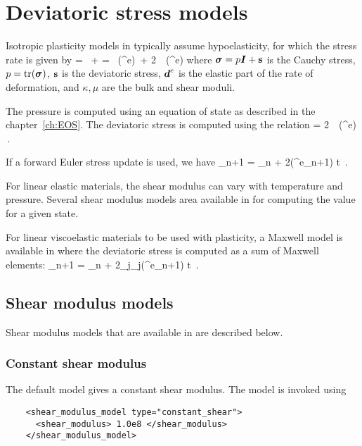 \chapter{Deviatoric stress models} \label{ch:DevStress}

Isotropic plasticity models in \Vaango typically assume hypoelasticity,
for which the stress rate is given by
\Beq
  \dot{\Bsig} = ~\BI + \dot{\Bs}
              = \kappa~\Tr(\BdT^e)~\BI + 2~\mu~\Dev(\BdT^e) 
\Eeq
where $\boldsymbol{\sigma} = p\boldsymbol{I} + \mathbf{s}$ is the Cauchy stress, $p = \text{tr}(\boldsymbol{\sigma})$, 
$\mathbf{s}$ is the deviatoric stress, $\boldsymbol{d}^e$ is the elastic part of
the rate of deformation, and $\kappa, \mu$ are the bulk and shear
moduli.  

The pressure is computed using an equation of state as
described in the chapter~\ref{ch:EOS}.  The deviatoric stress
is computed using the relation
\Beq
  \dot{\Bs} = 2~\mu~\Dev(\BdT^e) \,.
\Eeq

If a forward Euler stress update is used, we have
\Beq
  \Bs_{n+1} = \Bs_{n} + 2\mu\Dev(\BdT^e_{n+1}) \Delta t \,.
\Eeq

For linear elastic materials, the shear modulus can vary with temperature
and pressure.  Several shear modulus models area available in \Vaango
for computing the value for a given state.  

For linear viscoelastic materials to be used with plasticity, a Maxwell 
model is available in \Vaango where the deviatoric stress is computed 
as a sum of Maxwell elements:
\Beq
  \Bs_{n+1} = \Bs_{n} + 2\sum_j\mu_j\Dev(\BdT^e_{n+1}) \Delta t \,.
\Eeq

\section{Shear modulus models} \label{sec:ModelShear}

Shear modulus models that are available in \Vaango are described below.

  \subsection{Constant shear modulus}
  The default model gives a constant shear modulus.  The model is 
  invoked using
  \lstset{language=XML}
  \begin{lstlisting}
    <shear_modulus_model type="constant_shear">
      <shear_modulus> 1.0e8 </shear_modulus>
    </shear_modulus_model>
  \end{lstlisting}

